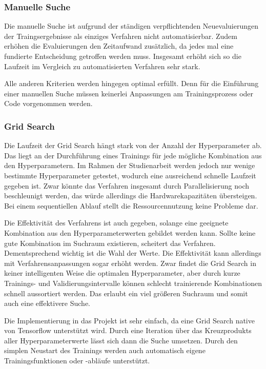 \subsubsection{Manuelle Suche}
Die manuelle Suche ist aufgrund der ständigen verpflichtenden Neuevaluierungen der Traingsergebnisse als einziges Verfahren  nicht automatisierbar.
Zudem erhöhen die Evaluierungen den Zeitaufwand zusätzlich, da jedes mal eine fundierte Entscheidung getroffen werden muss.
Insgesamt erhöht sich so die Laufzeit im Vergleich zu automatisierten Verfahren sehr stark.
\newline

Alle anderen Kriterien werden hingegen optimal erfüllt.
Denn für die Einführung einer manuellen Suche müssen keinerlei Anpassungen am Trainingsprozess oder Code vorgenommen werden.

\subsubsection{Grid Search}
Die Laufzeit der Grid Search hängt stark von der Anzahl der Hyperparameter ab.
Das liegt an der Durchführung eines Trainings für jede mögliche Kombination aus den Hyperparametern.
Im Rahmen der Studienarbeit werden jedoch nur wenige bestimmte Hyperparameter getestet, wodurch eine ausreichend schnelle Laufzeit gegeben ist.
Zwar könnte das Verfahren insgesamt durch Parallelisierung noch beschleunigt werden, das würde allerdings die Hardwarekapazitäten übersteigen.
Bei einem sequentiellen Ablauf stellt die Ressourcennutzung keine Probleme dar.
\newline

Die Effektivität des Verfahrens ist auch gegeben, solange eine geeignete Kombination aus den Hyperparameterwerten gebildet werden kann.
Sollte keine gute Kombination im Suchraum existieren, scheitert das Verfahren.
Dementsprechend wichtig ist die Wahl der Werte.
Die Effektivität kann allerdings mit Verfahrensanpassungen sogar erhöht werden.
Zwar findet die Grid Search in keiner intelligenten Weise die optimalen Hyperparameter, aber durch kurze Trainings- und Validierungsintervalle können schlecht trainierende Kombinationen schnell aussortiert werden.
Das erlaubt ein viel größeren Suchraum und somit auch eine effektivere Suche.
\newline

Die Implementierung in das Projekt ist sehr einfach, da eine Grid Search native von Tensorflow unterstützt wird.
Durch eine Iteration über das Kreuzprodukts aller Hyperparameterwerte lässt sich dann die Suche umsetzen.
Durch den simplen Neustart des Trainings werden auch automatisch eigene Trainingsfunktionen oder -abläufe unterstützt.

